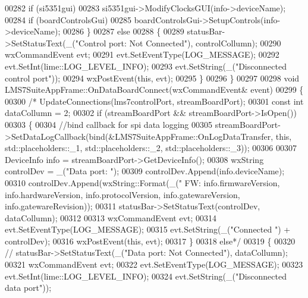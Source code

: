 \begin{DoxyCode}
{{{{00282         \textcolor{keywordflow}{if} (si5351gui)
00283             si5351gui->ModifyClocksGUI(info->deviceName);
00284         \textcolor{keywordflow}{if} (boardControlsGui)
00285             boardControlsGui->SetupControls(info->deviceName);
00286     \}
00287     \textcolor{keywordflow}{else}
00288     \{
00289         statusBar->SetStatusText(\_(\textcolor{stringliteral}{"Control port: Not Connected"}), controlCollumn);
00290         wxCommandEvent evt;
00291         evt.SetEventType(LOG\_MESSAGE);
00292         evt.SetInt(lime::LOG_LEVEL_INFO);
00293         evt.SetString(\_(\textcolor{stringliteral}{"Disconnected control port"}));
00294         wxPostEvent(\textcolor{keyword}{this}, evt);
00295     \}
00296 \}
00297 
00298 \textcolor{keywordtype}{void} LMS7SuiteAppFrame::OnDataBoardConnect(wxCommandEvent& event)
00299 \{
00300    \textcolor{comment}{/* UpdateConnections(lms7controlPort, streamBoardPort);}
00301 \textcolor{comment}{    const int dataCollumn = 2;}
00302 \textcolor{comment}{    if (streamBoardPort && streamBoardPort->IsOpen())}
00303 \textcolor{comment}{    \{}
00304 \textcolor{comment}{        //bind callback for spi data logging}
00305 \textcolor{comment}{        streamBoardPort->SetDataLogCallback(bind(&LMS7SuiteAppFrame::OnLogDataTransfer, this,
       std::placeholders::\_1, std::placeholders::\_2, std::placeholders::\_3));}
00306 \textcolor{comment}{}
00307 \textcolor{comment}{        DeviceInfo info = streamBoardPort->GetDeviceInfo();}
00308 \textcolor{comment}{        wxString controlDev = \_("Data port: ");}
00309 \textcolor{comment}{        controlDev.Append(info.deviceName);}
00310 \textcolor{comment}{        controlDev.Append(wxString::Format(\_(" FW:%
       info.firmwareVersion, info.hardwareVersion, info.protocolVersion, info.gatewareVersion, info.gatewareRevision));}
00311 \textcolor{comment}{        statusBar->SetStatusText(controlDev, dataCollumn);}
00312 \textcolor{comment}{}
00313 \textcolor{comment}{        wxCommandEvent evt;}
00314 \textcolor{comment}{        evt.SetEventType(LOG\_MESSAGE);}
00315 \textcolor{comment}{        evt.SetString(\_("Connected ") + controlDev);}
00316 \textcolor{comment}{        wxPostEvent(this, evt);}
00317 \textcolor{comment}{    \}}
00318 \textcolor{comment}{    else*/}
00319     \{
00320 \textcolor{comment}{//        statusBar->SetStatusText(\_("Data port: Not Connected"), dataCollumn);}
00321         wxCommandEvent evt;
00322         evt.SetEventType(LOG\_MESSAGE);
00323         evt.SetInt(lime::LOG_LEVEL_INFO);
00324         evt.SetString(\_(\textcolor{stringliteral}{"Disconnected data port"}));
}}}}
\end{DoxyCode}
